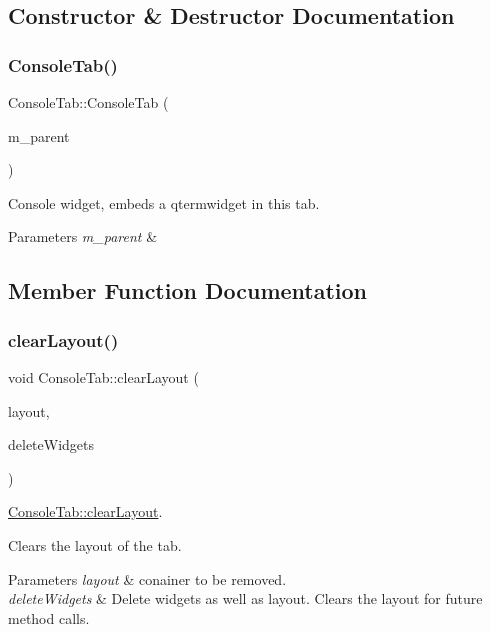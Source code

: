 \subsection{Constructor \& Destructor Documentation}
\mbox{\label{classConsoleTab_a2c631d14f9fe5957e0622e10269e5115}} 
\subsubsection{\texorpdfstring{Console\+Tab()}{ConsoleTab()}}
{\footnotesize\ttfamily Console\+Tab\+::\+Console\+Tab (\begin{DoxyParamCaption}\item[{Q\+Widget $\ast$}]{m\+\_\+parent }\end{DoxyParamCaption})}

Console widget, embeds a qtermwidget in this tab. 
\begin{DoxyParams}{Parameters}
{\em m\+\_\+parent} & \\
\hline
\end{DoxyParams}


\subsection{Member Function Documentation}
\mbox{\label{classConsoleTab_aae70e23b23e401b219edefcac4882eaf}} 
\subsubsection{\texorpdfstring{clear\+Layout()}{clearLayout()}}
{\footnotesize\ttfamily void Console\+Tab\+::clear\+Layout (\begin{DoxyParamCaption}\item[{Q\+Layout $\ast$}]{layout,  }\item[{bool}]{delete\+Widgets }\end{DoxyParamCaption})}



\hyperlink{classConsoleTab_aae70e23b23e401b219edefcac4882eaf}{Console\+Tab\+::clear\+Layout}. 

Clears the layout of the tab. 
\begin{DoxyParams}{Parameters}
{\em layout} & conainer to be removed. \\
\hline
{\em delete\+Widgets} & Delete widgets as well as layout. Clears the layout for future method calls. \\
\hline
\end{DoxyParams}
\mbox{\label{classConsoleTab_a7b2d0987db00c8b9af7ece7b36a82624}} 
